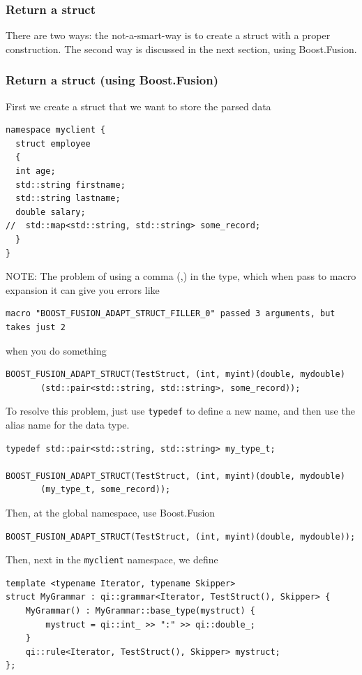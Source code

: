 \subsubsection{Return a struct}

There are two ways: the not-a-smart-way is to create a struct with a
proper construction. The second way is discussed in the next section, using
Boost.Fusion.

\subsubsection{Return a struct (using Boost.Fusion)}


First we create a struct that we want to store the parsed data
\begin{verbatim}
namespace myclient {
  struct employee
  {
  int age;
  std::string firstname;
  std::string lastname;
  double salary;
//  std::map<std::string, std::string> some_record;
  }
}
\end{verbatim}
NOTE: The problem of using a comma (,) in the type, which when pass to macro
expansion it can give you errors like
\begin{verbatim}
macro "BOOST_FUSION_ADAPT_STRUCT_FILLER_0" passed 3 arguments, but takes just 2
\end{verbatim}
when you do something
\begin{verbatim}
BOOST_FUSION_ADAPT_STRUCT(TestStruct, (int, myint)(double, mydouble)
       (std::pair<std::string, std::string>, some_record));
\end{verbatim}
To resolve this problem, just use \verb!typedef! to define a new name, and then
use the alias name for the data type.
\begin{verbatim}
typedef std::pair<std::string, std::string> my_type_t;

BOOST_FUSION_ADAPT_STRUCT(TestStruct, (int, myint)(double, mydouble)
       (my_type_t, some_record));
\end{verbatim}


Then, at the global namespace, use Boost.Fusion
\begin{verbatim}
BOOST_FUSION_ADAPT_STRUCT(TestStruct, (int, myint)(double, mydouble));
\end{verbatim}

Then, next in the \verb!myclient! namespace, we define
\begin{verbatim}
template <typename Iterator, typename Skipper>
struct MyGrammar : qi::grammar<Iterator, TestStruct(), Skipper> {
    MyGrammar() : MyGrammar::base_type(mystruct) {
        mystruct = qi::int_ >> ":" >> qi::double_;
    }
    qi::rule<Iterator, TestStruct(), Skipper> mystruct;
};
\end{verbatim}

